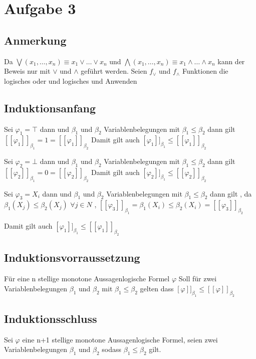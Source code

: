\section*{Aufgabe 3}

\subsection*{Anmerkung}
Da $ \bigvee (x_1, \ldots , x_n) \equiv x_1 \vee \ldots \vee x_n $ und $\bigwedge(x_1, \ldots , x_n) \equiv x_1 \wedge \ldots \wedge x_n $ kann der Beweis nur mit $\vee $ und $\wedge $ geführt werden. Seien $f_\vee$ und $f_\wedge$ Funktionen die logisches oder und logisches und Anwenden 

\subsection*{Induktionsanfang}
Sei $ \varphi_1 = \top$ dann und $\beta_1 $ und $\beta_2 $ Variablenbelegungen mit $\beta_1 \leq \beta_2 $ dann gilt $[[\varphi_1 ]]_{\beta_1}=1=  [[\varphi_1 ]]_{\beta_2}$ Damit gilt auch $[\varphi_1 ]]_{\beta_1} \leq  [[\varphi_1 ]]_{\beta_2}$


Sei $ \varphi_2 = \bot $ dann und $\beta_1 $ und $\beta_2 $ Variablenbelegungen mit $\beta_1 \leq \beta_2 $ dann gilt $[[\varphi_2 ]]_{\beta_1}=0=  [[\varphi_2 ]]_{\beta_2}$ Damit gilt auch $[\varphi_2 ]]_{\beta_1} \leq  [[\varphi_2 ]]_{\beta_2}$



Sei $ \varphi_3 = X_i $ dann und $\beta_1 $ und $\beta_2 $ Variablenbelegungen mit $\beta_1 \leq \beta_2 $ dann gilt , da 
$\beta_1(X_j) \leq \beta_2 (X_j)$ $ \forall j\in N$ , $[[\varphi_3 ]]_{\beta_1}= \beta_1(X_i) \leq \beta_2 (X_i) = [[\varphi_3 ]]_{\beta_2}$

 Damit gilt auch $[\varphi_1 ]]_{\beta_1} \leq  [[\varphi_1 ]]_{\beta_2}$
 
 \subsection*{Induktionsvorraussetzung}
 Für eine n stellige monotone Aussagenlogische Formel $\varphi $ Soll für zwei  Variablenbelegungen $\beta_1 $ und $\beta_2 $ mit $\beta_1 \leq \beta_2 $ gelten dass $[\varphi ]]_{\beta_1} \leq  [[\varphi ]]_{\beta_2}$
 
 \subsection*{Induktionsschluss}
 Sei $\varphi$ eine n+1 stellige monotone Aussagenlogische Formel, seien zwei Variablenbelegungen $\beta_1 $ und $\beta_2 $ sodass $\beta_1 \leq \beta_2 $ gilt.
 
